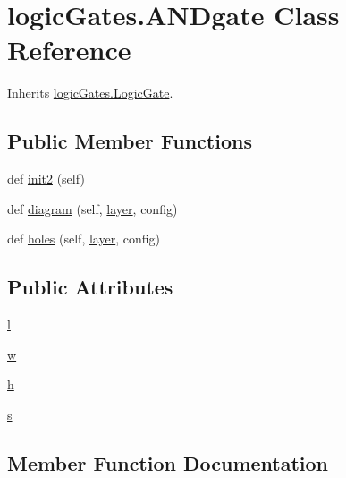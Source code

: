 \hypertarget{classlogic_gates_1_1_a_n_dgate}{}\section{logic\+Gates.\+A\+N\+Dgate Class Reference}
\label{classlogic_gates_1_1_a_n_dgate}


Inherits \hyperlink{classlogic_gates_1_1_logic_gate}{logic\+Gates.\+Logic\+Gate}.

\subsection*{Public Member Functions}
\begin{DoxyCompactItemize}
\item 
def \hyperlink{classlogic_gates_1_1_a_n_dgate_a7c31cd765c5363793824029a5be28f5b}{init2} (self)
\item 
def \hyperlink{classlogic_gates_1_1_a_n_dgate_ad2ca6756d5aa905df086fc1c985ab064}{diagram} (self, \hyperlink{classpath_1_1_part_aa1d9912dfa1d7e3222df898d2a18786f}{layer}, config)
\item 
def \hyperlink{classlogic_gates_1_1_a_n_dgate_aeeae6b6bd833f84fb503849115f722fb}{holes} (self, \hyperlink{classpath_1_1_part_aa1d9912dfa1d7e3222df898d2a18786f}{layer}, config)
\end{DoxyCompactItemize}
\subsection*{Public Attributes}
\begin{DoxyCompactItemize}
\item 
\hyperlink{classlogic_gates_1_1_a_n_dgate_a3046ffd251165180bc29b35d5b260fc0}{l}
\item 
\hyperlink{classlogic_gates_1_1_a_n_dgate_a4011635874a653e47fa69cd6ce968f36}{w}
\item 
\hyperlink{classlogic_gates_1_1_a_n_dgate_ac8a2576cf72d2dc3112496a488c31beb}{h}
\item 
\hyperlink{classlogic_gates_1_1_a_n_dgate_a5b5585a3cf1bf9fd94fcc438987b14b2}{s}
\end{DoxyCompactItemize}


\subsection{Member Function Documentation}
\hypertarget{classlogic_gates_1_1_a_n_dgate_ad2ca6756d5aa905df086fc1c985ab064}{}
